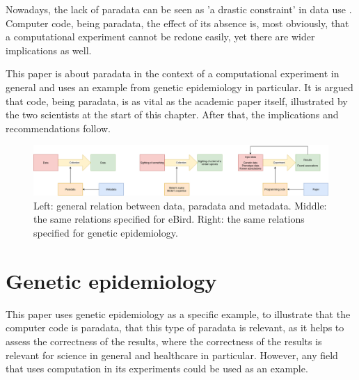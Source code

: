 
Nowadays, the lack of paradata can be seen as 'a drastic constraint'
in data use \cite{huvila2022improving}.
Computer code, being paradata, the effect of its absence is, most obviously,
that a computational experiment cannot be redone 
easily,
yet there are wider implications as well.


This paper is about paradata in the context of a computational
experiment in general and uses an example from genetic 
epidemiology in particular.
It is argued that code, being paradata, is as vital as the academic
paper itself, illustrated by the two scientists at the start of 
this chapter. After that, the implications and recommendations
follow.

\begin{figure}[!htbp]
  \centering
  \includegraphics[width=\linewidth]{figure_1.png}
  \caption{
    Left: general relation between data, paradata and metadata.
    Middle: the same relations specified for eBird.
    Right: the same relations specified for genetic epidemiology.
  }
  \label{fig:figure_1}
\end{figure}

\section{Genetic epidemiology}


This paper uses genetic epidemiology as a specific example,
to illustrate that the computer code is paradata,
that this type of paradata is relevant, as it helps 
to assess the correctness of the results,
where the correctness of the results is relevant for 
science in general and healthcare in particular.
However, any field that uses computation in its experiments
could be used as an example.

